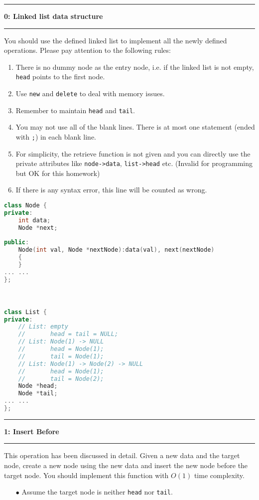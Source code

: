 \documentclass[10.5pt]{article}
\newcommand\question[2]{\vspace{.25in}\hrule\textbf{#1: #2}\vspace{.5em}\hrule\vspace{.10in}}
\begin{document}
\question{0}{Linked list data structure}
You should use the defined linked list to implement all the newly defined operations. Please pay attention to the following rules:
\begin{enumerate}
	\item There is no dummy node as the entry node, i.e. if the linked list is not empty, \texttt{head} points to the first node.
	\item Use \texttt{new} and \texttt{delete} to deal with memory issues.
	\item Remember to maintain \texttt{head} and \texttt{tail}.
	\item You may not use all of the blank lines. There is at most one statement (ended with \texttt{;}) in each blank line.
	\item For simplicity, the retrieve function is not given and you can directly use the private attributes like \texttt{node->data}, \texttt{list->head} etc. (Invalid for programming but OK for this homework)
	\item If there is any syntax error, this line will be counted as wrong.
\end{enumerate}

\hrulefill
\begin{lstlisting}[language=C++]
class Node {
private:
    int data;
    Node *next;
    
public:
    Node(int val, Node *nextNode):data(val), next(nextNode)
    {
    }
... ...
};



class List {
private:
	// List: empty
	//       head = tail = NULL;
	// List: Node(1) -> NULL
	//       head = Node(1);
	//       tail = Node(1);
	// List: Node(1) -> Node(2) -> NULL
	//       head = Node(1);
	//       tail = Node(2); 
	Node *head;
	Node *tail;
... ...
};
\end{lstlisting}
\pagebreak

\question{1}{Insert Before}
This operation has been discussed in detail. Given a new data and the target node, create a new node using the new data and insert the new node before the target node. You should implement this function with $O(1)$ time complexity.
\begin{enumerate}
	\item[$\bullet$] Assume the target node is neither \texttt{head} nor \texttt{tail}.
\end{enumerate}
\end{document}
